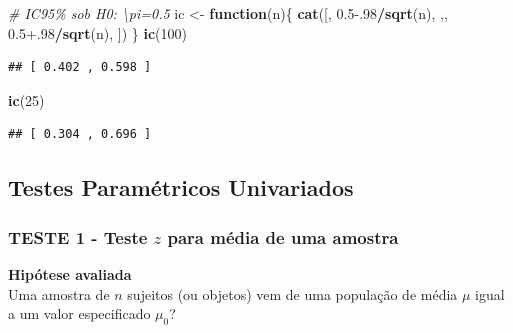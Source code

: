 \documentclass[
]{book}
\newenvironment{Shaded}{\begin{snugshade}}{\end{snugshade}}
\newcommand{\CommentTok}[1]{\textcolor[rgb]{0.56,0.35,0.01}{\textit{#1}}}
\newcommand{\ControlFlowTok}[1]{\textcolor[rgb]{0.13,0.29,0.53}{\textbf{#1}}}
\newcommand{\DecValTok}[1]{\textcolor[rgb]{0.00,0.00,0.81}{#1}}
\newcommand{\FloatTok}[1]{\textcolor[rgb]{0.00,0.00,0.81}{#1}}
\newcommand{\KeywordTok}[1]{\textcolor[rgb]{0.13,0.29,0.53}{\textbf{#1}}}
\newcommand{\NormalTok}[1]{#1}
\newcommand{\OperatorTok}[1]{\textcolor[rgb]{0.81,0.36,0.00}{\textbf{#1}}}
\newcommand{\StringTok}[1]{\textcolor[rgb]{0.31,0.60,0.02}{#1}}
\theoremstyle{definition}
\theoremstyle{definition}
\theoremstyle{definition}
\theoremstyle{remark}
\begin{document}
\begin{Shaded}
\begin{Highlighting}[]
\CommentTok{\# IC95\% sob H0: \textbackslash{}pi=0.5}
\NormalTok{ic \textless{}{-}}\StringTok{ }\ControlFlowTok{function}\NormalTok{(n)\{}
  \KeywordTok{cat}\NormalTok{(}\StringTok{\textquotesingle{}[\textquotesingle{}}\NormalTok{, }\FloatTok{0.5{-}.98}\OperatorTok{/}\KeywordTok{sqrt}\NormalTok{(n), }\StringTok{\textquotesingle{},\textquotesingle{}}\NormalTok{, }
           \FloatTok{0.5+.98}\OperatorTok{/}\KeywordTok{sqrt}\NormalTok{(n), }\StringTok{\textquotesingle{}]\textquotesingle{}}\NormalTok{)  }
\NormalTok{\}}
\KeywordTok{ic}\NormalTok{(}\DecValTok{100}\NormalTok{)}
\end{Highlighting}
\end{Shaded}

\begin{verbatim}
## [ 0.402 , 0.598 ]
\end{verbatim}

\begin{Shaded}
\begin{Highlighting}[]
\KeywordTok{ic}\NormalTok{(}\DecValTok{25}\NormalTok{)}
\end{Highlighting}
\end{Shaded}

\begin{verbatim}
## [ 0.304 , 0.696 ]
\end{verbatim}

\hypertarget{testes-paramuxe9tricos-univariados}{%
\subsection{Testes Paramétricos Univariados}\label{testes-paramuxe9tricos-univariados}}

\hypertarget{teste-1---teste-z-para-muxe9dia-de-uma-amostra}{%
\subsubsection*{\texorpdfstring{TESTE 1 - Teste \(z\) para média de uma amostra}{TESTE 1 - Teste z para média de uma amostra}}\label{teste-1---teste-z-para-muxe9dia-de-uma-amostra}}

\textbf{Hipótese avaliada}\\
Uma amostra de \(n\) sujeitos (ou objetos) vem de uma população de média \(\mu\) igual a um valor especificado \(\mu_0\)?
\end{document}
